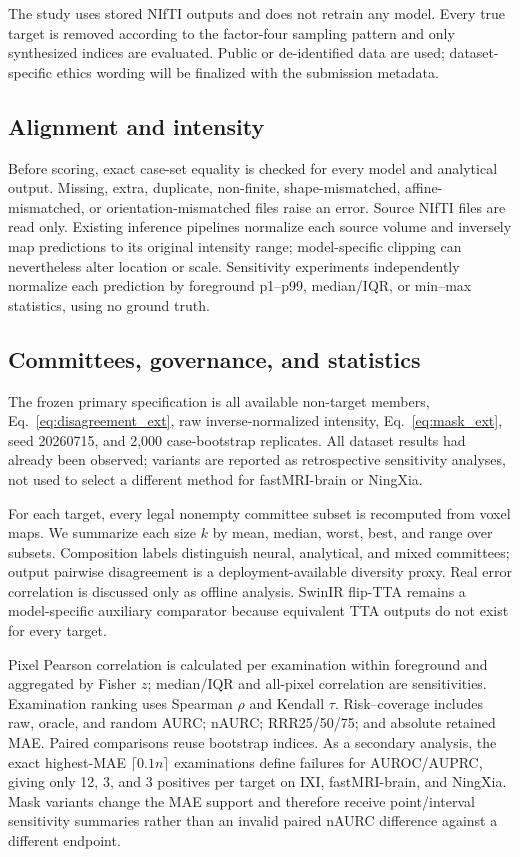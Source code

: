 \documentclass{article}
\begin{document}
The study uses stored NIfTI outputs and does not retrain any model. Every true target is removed according to the factor-four sampling pattern and only synthesized indices are evaluated. Public or de-identified data are used; dataset-specific ethics wording will be finalized with the submission metadata.

\subsection{Alignment and intensity}
Before scoring, exact case-set equality is checked for every model and analytical output. Missing, extra, duplicate, non-finite, shape-mismatched, affine-mismatched, or orientation-mismatched files raise an error. Source NIfTI files are read only. Existing inference pipelines normalize each source volume and inversely map predictions to its original intensity range; model-specific clipping can nevertheless alter location or scale. Sensitivity experiments independently normalize each prediction by foreground p1--p99, median/IQR, or min--max statistics, using no ground truth.

\subsection{Committees, governance, and statistics}
The frozen primary specification is all available non-target members, Eq.~\eqref{eq:disagreement_ext}, raw inverse-normalized intensity, Eq.~\eqref{eq:mask_ext}, seed 20260715, and 2,000 case-bootstrap replicates. All dataset results had already been observed; variants are reported as retrospective sensitivity analyses, not used to select a different method for fastMRI-brain or NingXia.

For each target, every legal nonempty committee subset is recomputed from voxel maps. We summarize each size $k$ by mean, median, worst, best, and range over subsets. Composition labels distinguish neural, analytical, and mixed committees; output pairwise disagreement is a deployment-available diversity proxy. Real error correlation is discussed only as offline analysis. SwinIR flip-TTA remains a model-specific auxiliary comparator because equivalent TTA outputs do not exist for every target.

Pixel Pearson correlation is calculated per examination within foreground and aggregated by Fisher $z$; median/IQR and all-pixel correlation are sensitivities. Examination ranking uses Spearman $\rho$ and Kendall $\tau$. Risk--coverage includes raw, oracle, and random AURC; nAURC; RRR25/50/75; and absolute retained MAE. Paired comparisons reuse bootstrap indices. As a secondary analysis, the exact highest-MAE $\lceil0.1n\rceil$ examinations define failures for AUROC/AUPRC, giving only 12, 3, and 3 positives per target on IXI, fastMRI-brain, and NingXia. Mask variants change the MAE support and therefore receive point/interval sensitivity summaries rather than an invalid paired nAURC difference against a different endpoint.
\end{document}
